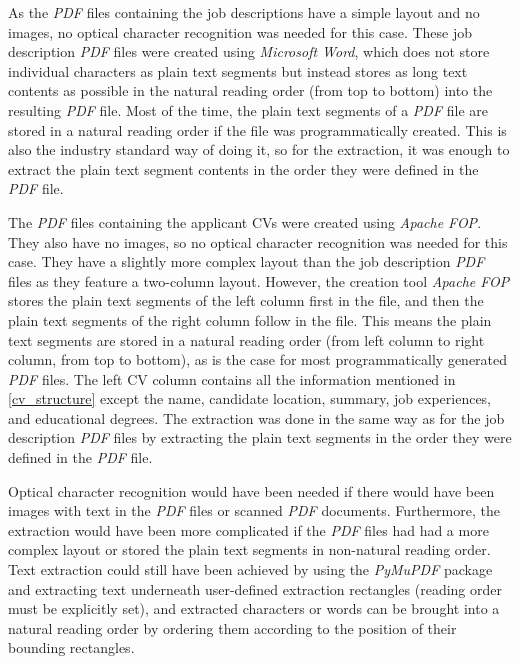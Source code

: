 \documentclass[draft,final]{thesisclass} %
\begin{document}
As the \textit{PDF} files containing the job descriptions have a simple layout and no images, no optical character recognition was needed for this case.
These job description \textit{PDF} files were created using \textit{Microsoft Word}, which does not store individual characters as plain text segments but instead stores as long text contents as possible in the natural reading order (from top to bottom) into the resulting \textit{PDF} file.
Most of the time, the plain text segments of a \textit{PDF} file are stored in a natural reading order if the file was programmatically created.
This is also the industry standard way of doing it, so for the extraction, it was enough to extract the plain text segment contents in the order they were defined in the \textit{PDF} file.

The \textit{PDF} files containing the applicant \acs{CV}s were created using \textit{Apache FOP}. They also have no images, so no optical character recognition was needed for this case.
They have a slightly more complex layout than the job description \textit{PDF} files as they feature a two-column layout.
However, the creation tool \textit{Apache FOP} stores the plain text segments of the left column first in the  file, and then the plain text segments of the right column follow in the file.
This means the plain text segments are stored in a natural reading order (from left column to right column, from top to bottom), as is the case for most programmatically generated \textit{PDF} files.
The left \acs{CV} column contains all the information mentioned in \ref{cv_structure} except the name, candidate location, summary, job experiences, and educational degrees.
The extraction was done in the same way as for the job description \textit{PDF} files by extracting the plain text segments in the order they were defined in the \textit{PDF} file.

Optical character recognition would have been needed if there would have been images with text in the \textit{PDF} files or scanned \textit{PDF} documents.
Furthermore, the extraction would have been more complicated if the \textit{PDF} files had had a more complex layout or stored the plain text segments in non-natural reading order.
Text extraction could still have been achieved by using the \textit{PyMuPDF} package and extracting text underneath user-defined extraction rectangles (reading order must be explicitly set), and extracted characters or words can be brought into a natural reading order by ordering them according to the position of their bounding rectangles.
\end{document}
